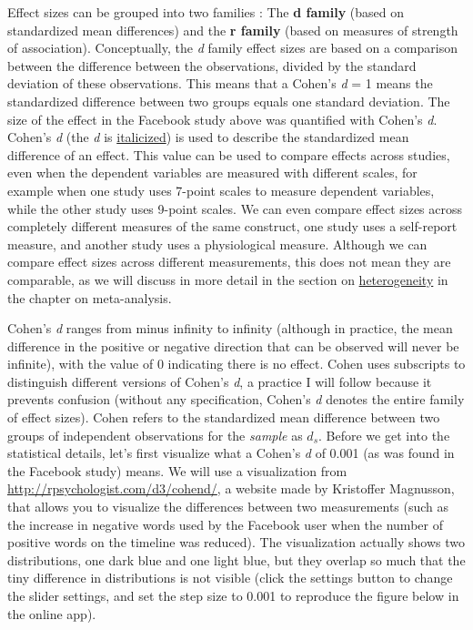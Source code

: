 \documentclass[
  oneside]{krantz}
\begin{document}
Effect sizes can be grouped into two families \citep{rosenthal_contrasts_2000}: The \textbf{d family} (based on standardized mean differences) and the \textbf{r family} (based on measures of strength of association). Conceptually, the \emph{d} family effect sizes are based on a comparison between the difference between the observations, divided by the standard deviation of these observations. This means that a Cohen's \emph{d} = 1 means the standardized difference between two groups equals one standard deviation. The size of the effect in the Facebook study above was quantified with Cohen's \emph{d}. Cohen's \emph{d} (the \emph{d} is \href{https://blog.apastyle.org/apastyle/2011/08/the-grammar-of-mathematics-writing-about-variables.html}{italicized}) is used to describe the standardized mean difference of an effect. This value can be used to compare effects across studies, even when the dependent variables are measured with different scales, for example when one study uses 7-point scales to measure dependent variables, while the other study uses 9-point scales. We can even compare effect sizes across completely different measures of the same construct, one study uses a self-report measure, and another study uses a physiological measure. Although we can compare effect sizes across different measurements, this does not mean they are comparable, as we will discuss in more detail in the section on \protect\hyperlink{heterogeneity}{heterogeneity} in the chapter on meta-analysis.

Cohen's \emph{d} ranges from minus infinity to infinity (although in practice, the mean difference in the positive or negative direction that can be observed will never be infinite), with the value of 0 indicating there is no effect. Cohen \citeyearpar{cohen_statistical_1988} uses subscripts to distinguish different versions of Cohen's \emph{d}, a practice I will follow because it prevents confusion (without any specification, Cohen's \emph{d} denotes the entire family of effect sizes). Cohen refers to the standardized mean difference between two groups of independent observations for the \emph{sample} as \(d_s\). Before we get into the statistical details, let's first visualize what a Cohen's \emph{d} of 0.001 (as was found in the Facebook study) means. We will use a visualization from \url{http://rpsychologist.com/d3/cohend/}, a website made by Kristoffer Magnusson, that allows you to visualize the differences between two measurements (such as the increase in negative words used by the Facebook user when the number of positive words on the timeline was reduced). The visualization actually shows two distributions, one dark blue and one light blue, but they overlap so much that the tiny difference in distributions is not visible (click the settings button to change the slider settings, and set the step size to 0.001 to reproduce the figure below in the online app).
\end{document}
